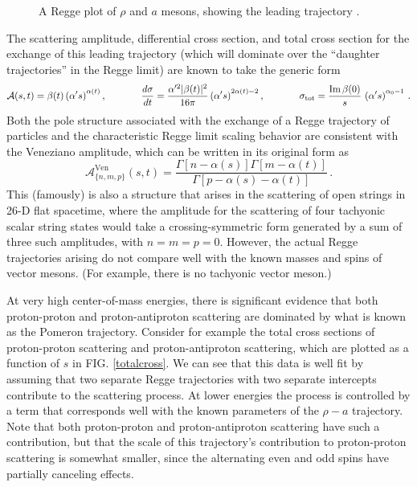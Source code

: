 \documentclass[aps, prd, preprintnumbers, floatfix, showpacs, showkeys, nofootinbib, 10pt]{revtex4-1}
\def\beq{\begin{equation}}
\def\eeq{\end{equation}}
\begin{document}
\begin{figure}
\begin{center}
\caption{\label{mesontraj} A Regge plot of $\rho$ and $a$ mesons, showing the leading trajectory \cite{PDG}.}
\end{center}
\end{figure}

The scattering amplitude, differential cross section, and total cross section for the exchange of this leading trajectory (which will dominate over the ``daughter trajectories'' in the Regge limit) are known to take the generic form
\beq
\mathcal{A}(s, t) = \beta(t) \left(\alpha' s\right)^{\alpha(t)}, \hspace{.5in} \frac{d\sigma}{dt} =  \frac{\alpha'^2 |\beta(t)|^2}{16\pi}\left(\alpha' s\right)^{2\alpha(t) - 2}, \hspace{.5in} \sigma_{\mathrm{tot}} = \frac{\Im \beta(0)}{s} \, \left(\alpha' s\right)^{\alpha_0 - 1} \, .
\eeq
Both the pole structure associated with the exchange of a Regge trajectory of particles and the characteristic Regge limit scaling behavior are consistent with the Veneziano amplitude, which can be written in its original form as
\beq
\mathcal{A}^{\mathrm{Ven}}_{\{n, m, p\}}(s, t) = \frac{\Gamma[n - \alpha(s)]\Gamma[m - \alpha(t)]}{\Gamma[p - \alpha(s) - \alpha(t)]} \, .
\eeq
This (famously) is also a structure that arises in the scattering of open strings in 26-D flat spacetime, where the amplitude for the scattering of four tachyonic scalar string states would take a crossing-symmetric form generated by a sum of three such amplitudes, with $n = m = p = 0$.  However, the actual Regge trajectories arising do not compare well with the known masses and spins of vector mesons.  (For example, there is no tachyonic vector meson.)

At very high center-of-mass energies, there is significant evidence that both proton-proton and proton-antiproton scattering are dominated by what is known as the Pomeron trajectory.  Consider for example the total cross sections of proton-proton scattering and proton-antiproton scattering, which are plotted as a function of $s$ in FIG. \ref{totalcross}.  We can see that this data is well fit by assuming that two separate Regge trajectories with two separate intercepts contribute to the scattering process.  At lower energies the process is controlled by a term that corresponds well with the known parameters of the $\rho-a$ trajectory.  Note that both proton-proton and proton-antiproton scattering have such a contribution, but that the scale of this trajectory's contribution to proton-proton scattering is somewhat smaller, since the alternating even and odd spins have partially canceling effects.  
\end{document}
